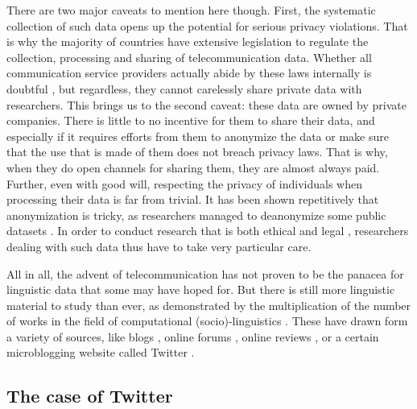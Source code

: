 \documentclass[../thesis.tex]{subfiles}
\begin{document}
There are two major caveats to mention here though. First, the systematic collection of
such data opens up the potential for serious privacy violations. That is why the
majority of countries have extensive legislation to regulate the collection, processing
and sharing of telecommunication data. Whether all communication service providers
actually abide by these laws internally is doubtful
\cite{GDPREnforcement,GDPRFines2023}, but regardless, they cannot carelessly share
private data with researchers. This brings us to the second caveat: these data are owned
by private companies. There is little to no incentive for them to share their data, and
especially if it requires efforts from them to anonymize the data or make sure that the
use that is made of them does not breach privacy laws. That is why, when they do open
channels for sharing them, they are almost always paid. Further, even with good will,
respecting the privacy of individuals when processing their data is far from trivial. It
has been shown repetitively that anonymization is tricky, as researchers managed
to deanonymize some public datasets
\cite{NarayananRobustDeanonymization2008,GambsDeanonymizationAttack2014}. In order to
conduct research that is both ethical and legal
\cite{OhmBrokenPromises2009a,KulkBraveNew2012}, researchers dealing with such data thus
have to take very particular care.

All in all, the advent of telecommunication has not proven to be the panacea for
linguistic data that some may have hoped for. But there is still more linguistic
material to study than ever, as demonstrated by the multiplication of the number of
works in the field of computational (socio)-linguistics
\cite{NguyenComputationalSociolinguistics2016}. These have drawn form a variety of
sources, like blogs \cite{NguyenAuthorAge2011,SchlerEffectsAge2006}, online forums
\cite{BaruaWhatAre2014,GarleyBeefmovesDissemination2012,NguyenAuthorAge2011}, online
reviews
\cite{HovyUserReview2015,Danescu-Niculescu-MizilNoCountry2013,OtterbacherInferringGender2010},
or a certain microblogging website called Twitter \cite{MocanuTwitterBabel2013,AlshaabiStorywranglerMassive2021,CodyClimateChange2015,ZamalHomophilyLatent2012,LiaoLifetimeLexical2014}.


\subsection{The case of Twitter}
\end{document}
